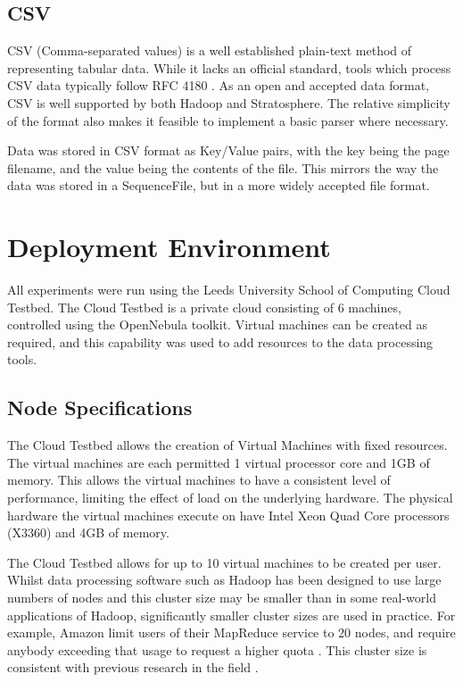 \subsection{CSV}
CSV (Comma-separated values) is a well established plain-text method of representing tabular data. While it lacks an official standard, tools which process CSV data typically follow RFC 4180 \cite{rfc4180}. As an open and accepted data format, CSV is well supported by both Hadoop and Stratosphere. The relative simplicity of the format also makes it feasible to implement a basic parser where necessary. 

Data was stored in CSV format as Key/Value pairs, with the key being the page filename, and the value being the contents of the file. This mirrors the way the data was stored in a SequenceFile, but in a more widely accepted file format. 

\section{Deployment Environment}
All experiments were run using the Leeds University School of Computing Cloud Testbed. The Cloud Testbed is a private cloud consisting of 6 machines, controlled using the OpenNebula toolkit. Virtual machines can be created as required, and this capability was used to add resources to the data processing tools. 

\subsection{Node Specifications}
The Cloud Testbed allows the creation of Virtual Machines with fixed resources. The virtual machines are each permitted 1 virtual processor core and 1GB of memory. This allows the virtual machines to have a consistent level of performance, limiting the effect of load on the underlying hardware. The physical hardware the virtual machines execute on have Intel Xeon Quad Core processors (X3360) and 4GB of memory.

The Cloud Testbed allows for up to 10 virtual machines to be created per user. Whilst data processing software such as Hadoop has been designed to use large numbers of nodes and this cluster size may be smaller than in some real-world applications of Hadoop, significantly smaller cluster sizes are used in practice. For example, Amazon limit users of their MapReduce service to 20 nodes, and require anybody exceeding that usage to request a higher quota \cite{emrlimits}. This cluster size is consistent with previous research in the field \cite{warneke2011exploiting}.

